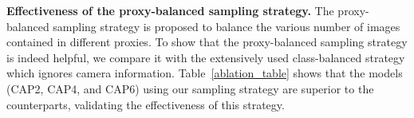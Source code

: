 \documentclass[letterpaper]{article} %
\begin{document}


\textbf{Effectiveness of the proxy-balanced sampling strategy.} The proxy-balanced sampling strategy is proposed to balance the various number of images contained in different proxies. To show that the proxy-balanced sampling strategy is indeed helpful, we compare it with the extensively used class-balanced strategy which ignores camera information. Table~\ref{ablation_table} shows that the models (CAP2, CAP4, and CAP6) using our sampling strategy are superior to the counterparts, validating the effectiveness of this strategy.
\end{document}

